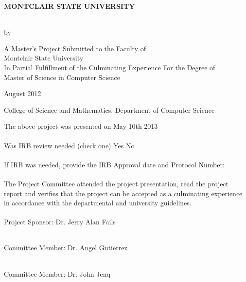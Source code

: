 \documentclass[11pt, a4paper, oneside]{Thesis} %
\begin{document}
\pagestyle{empty} %
\begin{center}{\huge\bf MONTCLAIR STATE UNIVERSITY\par}\end{center}
\begin{center}\ttitle\\
by\\
\authornames\end{center}
\begin{center}
A Master’s Project Submitted to the Faculty of\\
Montclair State University \\
In Partial Fulfillment of the Culminating Experience For the Degree of \\
Master of Science in Computer Science\end{center}
\begin{center}August 2012\end{center}
\begin{center}College of Science and Mathematics, Department of Computer Science\end{center}
The above project was presented on May 10th 2013\\
\\
Was IRB review needed (check one)   Yes    No\\
\\
If IRB was needed, provide the IRB Approval date and Protocol Number: \underline{\hspace{2cm}}\\
\\
The Project Committee attended the project presentation, read the project report and verifies that the project can be accepted as a culminating experience in accordance with the departmental and university guidelines.\\

\underline{\hspace{9cm}}\\ %
Project Sponsor:    Dr. Jerry Alan Fails

\underline{\hspace{9cm}}\\ %
Committee Member: Dr. Angel Gutierrez

\underline{\hspace{9cm}}\\ %
Committee Member: Dr. John Jenq\\
\end{document}
